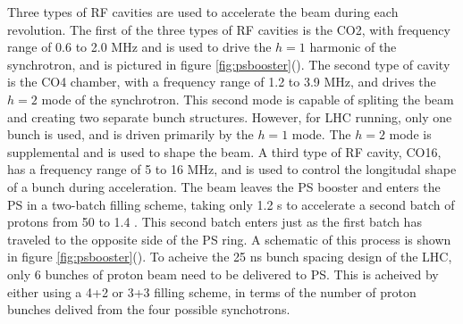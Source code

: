 \par Three types of RF cavities are used to accelerate the beam
during each revolution.  The first of the three types of RF cavities
is the CO2, with frequency range of 0.6 to 2.0 MHz and is used to
drive the $h=1$ harmonic of the  synchrotron, and is pictured in
figure \ref{fig:psbooster}().  The
second type of cavity is the CO4 chamber, with a frequency range of
1.2 to 3.9 MHz, and drives the $h=2$ mode of the synchrotron.  This
second mode is capable of spliting the beam and creating two separate
bunch  structures.  However, for LHC running, only one bunch is used,
and is driven primarily by the $h=1$ mode.  The $h=2$ mode is
supplemental and is used to shape the beam.  A third type of RF
cavity, CO16, has a frequency range of 5 to 16 MHz, and is used to
control the longitudal shape of a bunch during acceleration. The beam
leaves the PS booster and enters the PS in a two-batch filling scheme,
taking only 1.2 s to accelerate a second batch of protons from 50 \MeV
to 1.4 \GeV.  This second batch enters just as the first batch has
traveled to the opposite side of the PS ring.  A schematic of this
process is shown in figure
\ref{fig:psbooster}().  To acheive
the 25 ns bunch spacing design of the LHC, only 6 bunches of proton
beam need to be delivered to PS.  This is acheived by either using a
4+2 or 3+3 filling scheme, in terms of the number of proton bunches
delived from the four possible synchotrons.   

